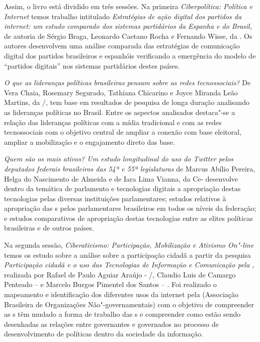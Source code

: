 Assim, o livro está dividido em três sessões. Na primeira
\emph{Ciberpolítica: \emph{Política e Internet }}temos trabalho
intitulado \emph{Estratégias de ação digital dos partidos da internet:
um estudo comparado dos sistemas partidários da Espanha e do Brasil,} de
autoria de Sérgio Braga, Leonardo Caetano Rocha e Fernando Wisse, da
. Os autores desenvolvem uma análise comparada das estratégias de
comunicação digital dos partidos brasileiros e espanhóis verificando a
emergência do modelo de ``partidos digitais'' nos sistemas partidários
destes países.

\emph{O que as lideranças políticas brasileiras pensam sobre as redes
tecnossociais?} De Vera Chaia, Rosemary Segurado, Tathiana Chicarino e
Joyce Miranda Leão Martins, da /, tem base em resultados de
pesquisa de longa duração analisando as lideranças políticas no Brasil.
Entre os aspectos analisados destaca"-se a relação das lideranças
políticas com a mídia tradicional e com as redes tecnossociais com o
objetivo central de ampliar a conexão com base eleitoral, ampliar a
mobilização e o engajamento direto das base.

\emph{Quem são os mais ativos? Um estudo longitudinal do uso do Twitter
pelos deputados federais brasileiros das 54ª e 55ª legislaturas} de
Marcus Abílio Pereira, Helga do Nascimento de Almeida e de Iara Lima
Vianna, da Ce- desenvolve dentro da temática de parlamento e
tecnologias digitais a apropriação destas tecnologias pelas diversas
instituições parlamentares; estudos relativos à apropriação das s
pelos parlamentares brasileiros em todos os níveis da federação; e
estudos comparativos de apropriação destas tecnologias entre as elites
políticas brasileiras e de outros países.

Na segunda sessão, \emph{Ciberativismo: Participação, Mobilização e
Ativismo On"-line} temos os estudo sobre a análise sobre a participação
cidadã a partir da pesquisa \emph{Participação cidadã e o uso das
Tecnologias de Informação e Comunicação pela ,} realizada por
Rafael de Paulo Aguiar Araújo - /, Claudio Luis de Camargo Penteado
--  e Marcelo Burgos Pimentel dos Santos -- . Foi realizado o
mapeamento e identificação dos diferentes usos da internet pela
(Associação Brasileira de Organizações Não"-governamentais) com o
objetivo de compreender as s têm mudado a forma de trabalho das s
e compreender como estão sendo desenhadas as relações entre governantes
e governados no processo de desenvolvimento de políticas dentro da
sociedade da informação.

